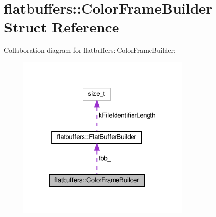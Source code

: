 \hypertarget{structflatbuffers_1_1ColorFrameBuilder}{}\section{flatbuffers\+:\+:Color\+Frame\+Builder Struct Reference}
\label{structflatbuffers_1_1ColorFrameBuilder}


Collaboration diagram for flatbuffers\+:\+:Color\+Frame\+Builder\+:
\nopagebreak
\begin{figure}[H]
\begin{center}
\leavevmode
\includegraphics[width=245pt]{structflatbuffers_1_1ColorFrameBuilder__coll__graph}
\end{center}
\end{figure}
